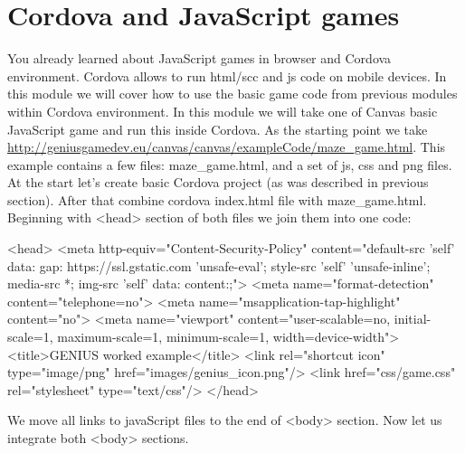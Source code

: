 \chapter{Cordova and JavaScript games}\label{CordovaAndJavascriptGame}

You already learned about JavaScript games in browser and Cordova environment. Cordova allows to run html/scc and js code on mobile devices. In this module we will cover how to use the basic game code from previous modules within Cordova environment. In this module we will take one of Canvas %
basic JavaScript game and run this inside Cordova. As the starting point we take \url{http://geniusgamedev.eu/canvas/canvas/exampleCode/maze_game.html}. This example contains a few files: maze\_game.html, and a set of js, css and png files. At the start let's create basic Cordova project (as was described in previous section). After that combine cordova index.html file with maze\_game.html. Beginning with <head> section of both files we join them into one code:

\begin{html}
<head>
        <meta http-equiv="Content-Security-Policy" content="default-src 'self' data: gap: https://ssl.gstatic.com 'unsafe-eval'; style-src 'self' 'unsafe-inline'; media-src *; img-src 'self' data: content:;">
        <meta name="format-detection" content="telephone=no">
        <meta name="msapplication-tap-highlight" content="no">
        <meta name="viewport" content="user-scalable=no, initial-scale=1, maximum-scale=1, minimum-scale=1, width=device-width">
        <title>GENIUS worked example</title>
        <link rel="shortcut icon" type="image/png" href="images/genius_icon.png"/>
        <link href="css/game.css" rel="stylesheet" type="text/css"/>
    </head>
\end{html}

We move all links to javaScript files to the end of <body> section. Now let us integrate both <body> sections.

